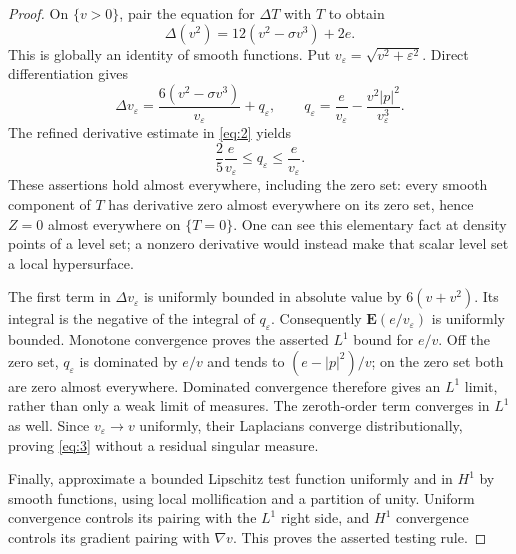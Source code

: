 \begin{proof}
On $\{v>0\}$, pair the equation for $\Delta T$ with $T$ to obtain
\[
 \Delta(v^2)=12(v^2-\sigma v^3)+2e.
\]
This is globally an identity of smooth functions. Put
$v_\varepsilon=\sqrt{v^2+\varepsilon^2}$. Direct differentiation gives
\[
 \Delta v_\varepsilon
 =\frac{6(v^2-\sigma v^3)}{v_\varepsilon}
   +q_\varepsilon,\qquad
 q_\varepsilon=\frac e{v_\varepsilon}
             -\frac{v^2|p|^2}{v_\varepsilon^3}.
\]
The refined derivative estimate in \eqref{eq:2} yields
\[
 \frac25\frac e{v_\varepsilon}
 \le q_\varepsilon\le\frac e{v_\varepsilon}.
\]
These assertions hold almost everywhere, including the zero set:
every smooth component of $T$ has derivative zero almost everywhere
on its zero set, hence $Z=0$ almost everywhere on $\{T=0\}$.
One can see this elementary fact at density points of a level set;
a nonzero derivative would instead make that scalar level set a
local hypersurface.

The first term in $\Delta v_\varepsilon$ is uniformly bounded in
absolute value by $6(v+v^2)$. Its integral is the negative of the
integral of $q_\varepsilon$. Consequently
$\mathbf E(e/v_\varepsilon)$ is uniformly bounded.
Monotone convergence proves the asserted $L^1$ bound for $e/v$.
Off the zero set, $q_\varepsilon$ is dominated by $e/v$ and tends
to $(e-|p|^2)/v$; on the zero set both are zero almost everywhere.
Dominated convergence therefore gives an $L^1$ limit, rather than
only a weak limit of measures. The zeroth-order term converges in
$L^1$ as well. Since $v_\varepsilon\to v$ uniformly, their
Laplacians converge distributionally, proving \eqref{eq:3} without
a residual singular measure.

Finally, approximate a bounded Lipschitz test function uniformly and
in $H^1$ by smooth functions, using local mollification and a
partition of unity. Uniform convergence controls its pairing with
the $L^1$ right side, and $H^1$ convergence controls its gradient
pairing with $\nabla v$. This proves the asserted testing rule.
\end{proof}
